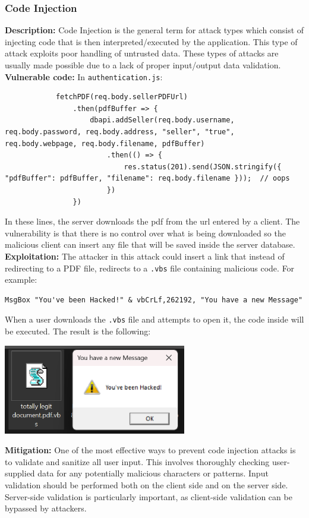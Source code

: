 \documentclass[]{article}
\begin{document}
\subsubsection{Code Injection}
\textbf{Description:} Code Injection is the general term for attack types which consist of injecting code that is then interpreted/executed by the application. This type of attack exploits poor handling of untrusted data. These types of attacks are usually made possible due to a lack of proper input/output data validation.
\\ \textbf{Vulnerable code:} In \texttt{authentication.js}:
\begin{lstlisting}
            fetchPDF(req.body.sellerPDFUrl)
                .then(pdfBuffer => {
                    dbapi.addSeller(req.body.username, req.body.password, req.body.address, "seller", "true", req.body.webpage, req.body.filename, pdfBuffer)
                        .then(() => {
                            res.status(201).send(JSON.stringify({ "pdfBuffer": pdfBuffer, "filename": req.body.filename }));  // oops
                        })
                })
\end{lstlisting}
In these lines, the server downloads the pdf from the url entered by a client. The vulnerability is that there is no control over what is being downloaded so the malicious client can insert any file that will be saved inside the server database.
\\ \textbf{Exploitation:} The attacker in this attack could insert a link that instead of redirecting to a PDF file, redirects to a \texttt{.vbs} file containing malicious code. For example:
\begin{lstlisting}
MsgBox "You've been Hacked!" & vbCrLf,262192, "You have a new Message"
\end{lstlisting}
When a user downloads the \texttt{.vbs} file and attempts to open it, the code inside will be executed.
The result is the following:
\begin{center}
\includegraphics[width=8cm]{images/code_inj.eps}
\end{center}
\textbf{Mitigation:} One of the most effective ways to prevent code injection attacks is to validate and sanitize all user input. This involves thoroughly checking user-supplied data for any potentially malicious characters or patterns. Input validation should be performed both on the client side and on the server side. Server-side validation is particularly important, as client-side validation can be bypassed by attackers. \\
\end{document}
